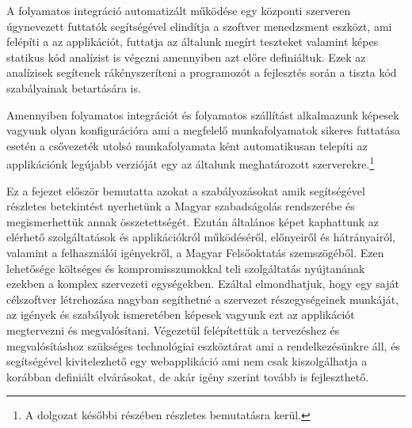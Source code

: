 A folyamatos integráció automatizált működése egy központi szerveren úgynevezett futtatók segítségével elindítja a szoftver menedzsment eszközt, ami felépíti a az applikációt, futtatja az általunk megírt teszteket valamint képes statikus kód analízist is végezni amennyiben azt előre definiáltuk. Ezek az analízisek segítenek rákényszeríteni a programozót a fejlesztés során a tiszta kód szabályainak betartására is.

Amennyiben folyamatos integrációt és folyamatos szállítást alkalmazunk képesek vagyunk olyan konfigurációra ami a megfelelő munkafolyamatok sikeres futtatása esetén a csővezeték utolsó munkafolyamata ként automatikusan telepíti az applikációnk legújabb verzióját egy az általunk meghatározott szerverekre.\footnote{A dolgozat későbbi részében részletes bemutatásra kerül.}


Ez a fejezet először bemutatta azokat a szabályozásokat amik segítségével részletes betekintést nyerhetünk a Magyar szabadságolás rendszerébe és megismerhettük annak összetettségét. Ezután általános képet kaphattunk az elérhető szolgáltatások és applikációkról működéséről, előnyeiről és hátrányairól, valamint a felhasználói igényekről, a Magyar Felsőoktatás szemszögéből. Ezen lehetősége költséges és kompromisszumokkal teli szolgáltatás nyújtanának ezekben a komplex szervezeti egységekben. Ezáltal elmondhatjuk, hogy egy saját célszoftver létrehozása nagyban segíthetné a szervezet részegységeinek munkáját, az igények és szabályok ismeretében képesek vagyunk ezt az applikációt megtervezni és megvalósítani. Végezetül felépítettük a tervezéshez és megvalósításhoz szükséges technológiai eszköztárat ami a rendelkezésünkre áll, és segítségével kivitelezhető egy webapplikáció ami nem csak kiszolgálhatja a korábban definiált elvárásokat, de akár igény szerint tovább is fejleszthető.
  